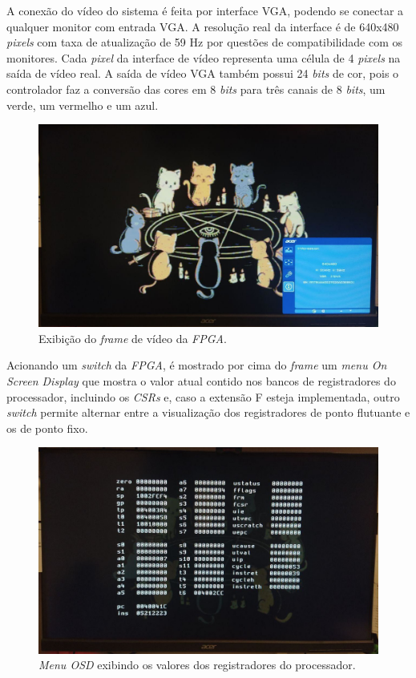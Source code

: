     { A conexão do vídeo do sistema é feita por interface VGA, podendo se
        conectar a qualquer monitor com entrada VGA. A resolução real da
        interface é de 640x480 \textit{pixels} com taxa de atualização de 59 Hz
        por questões de compatibilidade com os monitores. Cada \textit{pixel}
        da interface de vídeo representa uma célula de 4 \textit{pixels} na
        saída de vídeo real. A saída de vídeo VGA também possui 24 \textit{bits}
        de cor, pois o controlador faz a conversão das cores em 8 \textit{bits}
        para três canais de 8 \textit{bits}, um verde, um vermelho e um azul.
    }
    \begin{figure}[H]
    \centering
        \includegraphics[width=.7\linewidth]{../images/osd/display.jpg}
        \caption{Exibição do \textit{frame} de vídeo da \textit{FPGA}.}
        \label{fig:display_cats}
    \end{figure}

    { Acionando um \textit{switch} da \textit{FPGA}, é mostrado por cima do
        \textit{frame} um \textit{menu On Screen Display} que mostra o valor
        atual contido nos bancos de registradores do processador, incluindo os
        \textit{CSRs} e, caso a extensão F esteja implementada, outro
        \textit{switch} permite alternar entre a visualização dos registradores
        de ponto flutuante e os de ponto fixo.
    }
    \begin{figure}[H]
    \centering
        \includegraphics[width=.7\linewidth]{../images/osd/display_osd.jpg}
        \caption{\textit{Menu OSD} exibindo os valores dos registradores do processador.}
        \label{fig:display_cats_osd}
    \end{figure}

